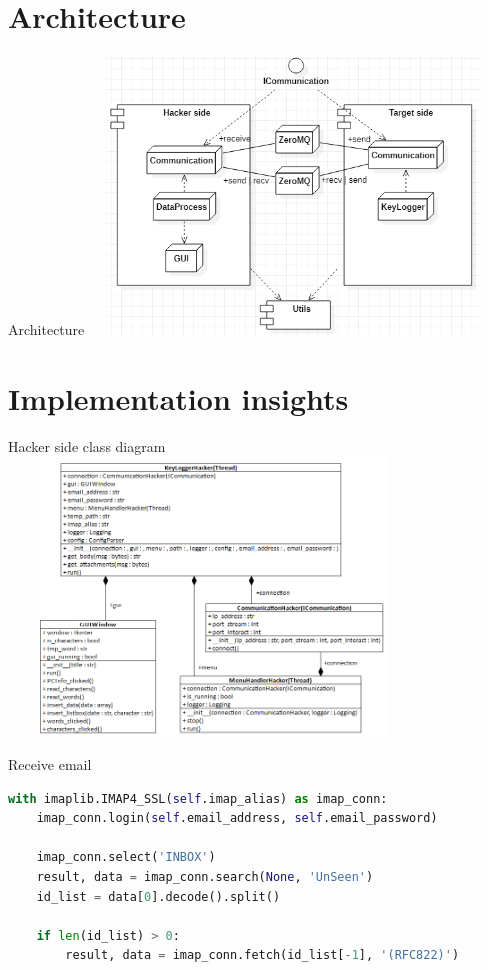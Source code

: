 \documentclass{beamer}
\begin{document}
\section{Architecture}
\begin{frame}[t]{Architecture}
\includegraphics[width=307pt, height=210pt]{../images/component diagram}
\end{frame}



\section{Implementation insights}
\begin{frame}[t]{Hacker side class diagram}
\includegraphics[width=307pt, height=210pt]{../images/hackerclassdiagram}
\end{frame}

\begin{frame}[fragile]{Receive email}
\begin{lstlisting}[language=Python]
with imaplib.IMAP4_SSL(self.imap_alias) as imap_conn:
	imap_conn.login(self.email_address, self.email_password)
	
	imap_conn.select('INBOX')
	result, data = imap_conn.search(None, 'UnSeen')
	id_list = data[0].decode().split()
	
	if len(id_list) > 0:
		result, data = imap_conn.fetch(id_list[-1], '(RFC822)')
\end{lstlisting}
\end{frame}
\end{document}
